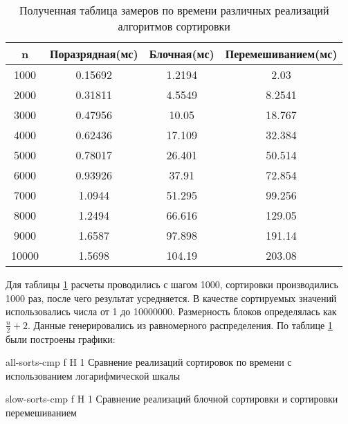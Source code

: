 \begin{table}[ht]
	\centering
	\caption{Полученная таблица замеров по времени различных реализаций алгоритмов сортировки}
	\begin{tabular}{|c|c|c|c|}
		\hline
		n     & Поразрядная(мс) & Блочная(мс) & Перемешиванием(мс) \\ \hline
		1000  & 0.15692         & 1.2194      & 2.03               \\ \hline
		2000  & 0.31811         & 4.5549      & 8.2541             \\ \hline
		3000  & 0.47956         & 10.05       & 18.767             \\ \hline
		4000  & 0.62436         & 17.109      & 32.384             \\ \hline
		5000  & 0.78017         & 26.401      & 50.514             \\ \hline
		6000  & 0.93926         & 37.91       & 72.854             \\ \hline
		7000  & 1.0944          & 51.295      & 99.256             \\ \hline
		8000  & 1.2494          & 66.616      & 129.05             \\ \hline
		9000  & 1.6587          & 97.898      & 191.14             \\ \hline
		10000 & 1.5698          & 104.19      & 203.08             \\ \hline
	\end{tabular}
	\label{t:timings}
\end{table}

Для таблицы \ref{t:timings} расчеты проводились с шагом 1000, сортировки производились 1000 раз, после чего результат усредняется. В качестве сортируемых значений использовались  числа от 1 до 10000000. Размерность блоков определялась как $\frac{n}{2} + 2$. Данные генерировались из равномерного распределения.
По таблице \ref{t:timings} были построены графики:

{all-sorts-cmp} %
{f} %
{H} %
{1\textwidth} %
{Сравнение реализаций сортировок по времени с использованием логарифмической шкалы} %


{slow-sorts-cmp} %
{f} %
{H} %
{1\textwidth} %
{Сравнение реализаций блочной сортировки и сортировки перемешиванием} %

